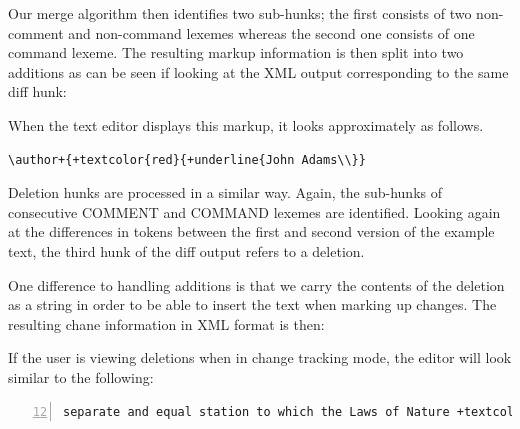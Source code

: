 
Our merge algorithm then identifies two sub-hunks; the first consists of two non-comment and non-command lexemes whereas the second one consists of one command lexeme.  The resulting markup information is then split into two additions as can be seen if looking at the XML output corresponding to the same diff hunk:


When the text editor displays this markup, it looks approximately as follows.

\begin{Verbatim}[frame=lines,label={Markup for first diff block in text editor},samepage=true,showspaces=true,commandchars=+\{\}]
\author+{+textcolor{red}{+underline{John Adams\\}}
\end{Verbatim}

Deletion hunks are processed in a similar way.  Again, the sub-hunks of consecutive COMMENT and COMMAND lexemes are identified.  Looking again at the differences in tokens between the first and second version of the example text, the third hunk of the diff output refers to a deletion.


One difference to handling additions is that we carry the contents of the deletion as a string in order to be able to insert the text when marking up changes.  The resulting chane information in XML format is then:


If the user is viewing deletions when in change tracking mode, the editor will look similar to the following:

\begin{Verbatim}[frame=lines,label={Markup of deletion block},numbers=left,firstnumber=12,showspaces=true,commandchars=+\{\}]
separate and equal station to which the Laws of Nature +textcolor{red}{+sout{and of Nature's God }}entitle them,
\end{Verbatim}

